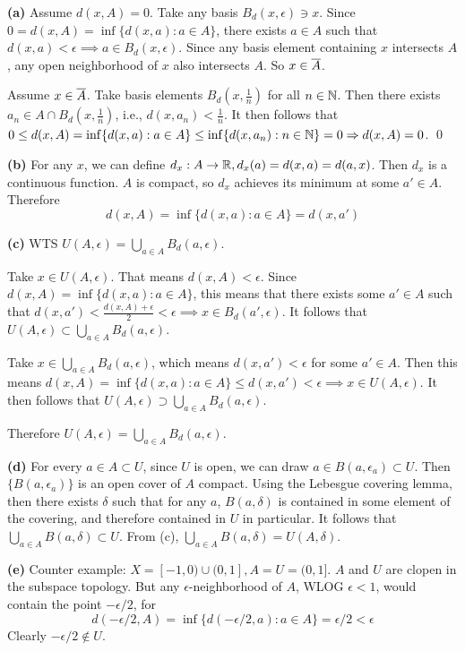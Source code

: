 \documentclass[a4paper, 12pt]{article}
\begin{document}
\begin{solution}
    \textbf{(a)} \pffwd Assume $d(x, A) = 0$. Take any basis $B_d(x, \epsilon) \ni x$. Since $0 = d(x, A) = \inf\{d(x, a) : a \in A\}$, there exists $a \in A$ such that $d(x, a) < \epsilon \implies a \in B_d(x, \epsilon)$. Since any basis element containing $x$ intersects $A$, any open neighborhood of $x$ also intersects $A$. So $x \in \overline{A}$.

    \pfbwd Assume $x \in \overline{A}$. Take basis elements $B_d(x, \frac{1}{n})$ for all $n \in \mathbb{N}$. Then there exists $a_n \in A \cap B_d(x, \frac{1}{n})$, i.e., $d(x, a_n) < \frac{1}{n}$. It then follows that $0 \leq d(x, A) = \inf\{d(x, a) : a \in A\} \leq \inf\{d(x, a_n) : n \in \mathbb{N}\} = 0 \Rightarrow d(x, A) = 0 $. \qed

    \textbf{(b)} For any $x$, we can define $d_x: A \to \mathbb{R}, d_x(a) = d(x, a) = d(a, x)$. Then $d_x$ is a continuous function. $A$ is compact, so $d_x$ achieves its minimum at some $a' \in A$. Therefore \begin{equation*}
    d(x, A) = \inf\{d(x, a): a \in A\} = d(x, a')
    \end{equation*}

    \textbf{(c)} WTS $U(A, \epsilon) = \bigcup_{a \in A} B_d(a, \epsilon)$.

    Take $x \in U(A, \epsilon)$. That means $d(x, A) < \epsilon$. Since $d(x, A) = \inf\{d(x, a): a \in A\}$, this means that there exists some $a' \in A$ such that $d(x, a') < \frac{d(x, A) + \epsilon}{2} < \epsilon \implies x \in B_d(a', \epsilon)$. It follows that $U(A, \epsilon) \subset \bigcup_{a \in A} B_d(a, \epsilon)$.

    Take $x \in \bigcup_{a \in A} B_d(a, \epsilon)$, which means $d(x, a') < \epsilon$ for some $a' \in A$. Then this means $d(x, A) = \inf\{d(x, a) : a \in A\} \leq d(x, a') < \epsilon \implies x \in U(A, \epsilon)$. It then follows that  $U(A, \epsilon) \supset \bigcup_{a \in A} B_d(a, \epsilon)$.

    Therefore $U(A, \epsilon) = \bigcup_{a \in A} B_d(a, \epsilon)$.

    \textbf{(d)} For every $a \in A \subset U$, since $U$ is open, we can draw $a \in B(a, \epsilon_a) \subset U$. Then $\{B(a, \epsilon_a)\}$ is an open cover of $A$ compact. Using the Lebesgue covering lemma, then there exists $\delta$ such that for any $a$, $B(a, \delta)$ is contained in some element of the covering, and therefore contained in $U$ in particular. It follows that $\bigcup_{a \in A} B(a, \delta) \subset U$. From (c), $\bigcup_{a \in A} B(a, \delta) = U(A, \delta)$.

    \textbf{(e)} Counter example: $X = [-1, 0) \cup (0, 1], A = U = (0, 1]$. $A$ and $U$ are clopen in the subspace topology. But any $\epsilon$-neighborhood of $A$, WLOG $\epsilon < 1$, would contain the point $-\epsilon/2$, for \begin{equation*}
    d(-\epsilon/2, A) = \inf\{d(-\epsilon/2, a) : a \in A\} = \epsilon/2 < \epsilon
    \end{equation*}
    Clearly $-\epsilon/2 \not \in U$.
\end{solution}
\end{document}

